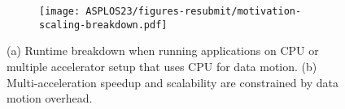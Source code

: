 \begin{figure}[h]
\begin{subfigure}[b]{\columnwidth}
\texttt{[image: ASPLOS23/figures-resubmit/motivation-scaling-breakdown.pdf]}
\caption{}
\label{fig:motivation:bar:breakdown}
\end{subfigure}
%

\begin{subfigure}[b]{\columnwidth}
\end{subfigure}
\caption{(a) Runtime breakdown when running applications on CPU or multiple accelerator setup that uses CPU for data motion. (b) Multi-acceleration speedup and scalability are constrained by data motion overhead.}
\label{fig:motivation:bar}
\end{figure}